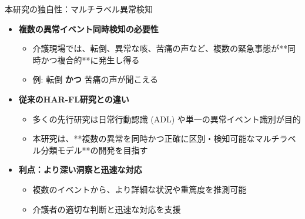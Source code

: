 \documentclass[unicode,12pt,aspectratio=169,dvipdfmx]{beamer}
\begin{document}
\begin{frame}{本研究の独自性：マルチラベル異常検知}
\begin{itemize}
    \item \textbf{複数の異常イベント同時検知の必要性}
    \begin{itemize}
        \item 介護現場では、転倒、異常な咳、苦痛の声など、複数の緊急事態が**同時かつ複合的**に発生し得る
        \item 例: 転倒 \textbf{かつ} 苦痛の声が聞こえる
    \end{itemize}
    \item \textbf{従来のHAR-FL研究との違い}
    \begin{itemize}
        \item 多くの先行研究は日常行動認識 (ADL) や単一の異常イベント識別が目的
        \item 本研究は、**複数の異常を同時かつ正確に区別・検知可能なマルチラベル分類モデル**の開発を目指す
    \end{itemize}
    \item \textbf{利点：より深い洞察と迅速な対応}
    \begin{itemize}
        \item 複数のイベントから、より詳細な状況や重篤度を推測可能
        \item 介護者の適切な判断と迅速な対応を支援
    \end{itemize}
\end{itemize}
\end{frame}
\end{document}
